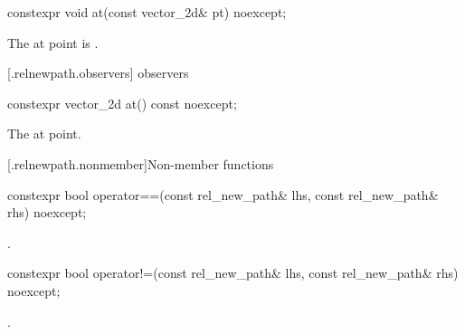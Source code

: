 %
\begin{itemdecl}
constexpr void at(const vector_2d& pt) noexcept;
\end{itemdecl}
\begin{itemdescr}
\pnum
\effects
The at point is .
\end{itemdescr}

 [\iotwod.relnewpath.observers]{ observers}%

%
\begin{itemdecl}
constexpr vector_2d at() const noexcept;
\end{itemdecl}
\begin{itemdescr}
\pnum
\returns
The at point.
\end{itemdescr}

 [\iotwod.relnewpath.nonmember]{Non-member functions}%

%
\begin{itemdecl}
constexpr bool operator==(const rel_new_path& lhs, const rel_new_path& rhs) 
  noexcept;
\end{itemdecl}
\begin{itemdescr}
\pnum
\returns
{}.
\end{itemdescr}

%
\begin{itemdecl}
constexpr bool operator!=(const rel_new_path& lhs, const rel_new_path& rhs) 
  noexcept;
\end{itemdecl}
\begin{itemdescr}
\pnum
\returns
{}.
\end{itemdescr}
